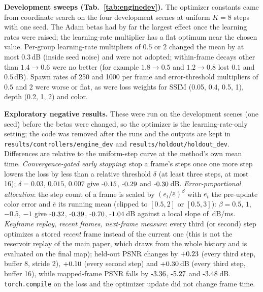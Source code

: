 \documentclass[10pt,twocolumn,letterpaper]{article}
\begin{document}
\textbf{Development sweeps (Tab.~\ref{tab:enginedev}).} The optimizer constants came from coordinate search on the four development scenes at uniform $K{=}8$ steps with one seed. The Adam betas had by far the largest effect once the learning rates were raised; the learning-rate multiplier has a flat optimum near the chosen value. Per-group learning-rate multipliers of $0.5$ or $2$ changed the mean by at most $0.3$\,dB (inside seed noise) and were not adopted; within-frame decays other than $1.4\to0.6$ were no better (for example $1.8\to0.5$ and $1.2\to0.8$ lost $0.1$ and $0.5$\,dB). Spawn rates of 250 and 1000 per frame and error-threshold multipliers of $0.5$ and $2$ were worse or flat, as were loss weights for SSIM (0.05, 0.4, 0.5, 1), depth (0.2, 1, 2) and color.


\textbf{Exploratory negative results.} These were run on the development scenes (one seed) before the betas were changed, so the optimizer is the learning-rate-only setting; the code was removed after the runs and the outputs are kept in \texttt{results/controllers/engine\_dev} and \texttt{results/holdout/holdout\_dev}. Differences are relative to the uniform-step curve at the method's own mean time. \emph{Convergence-gated early stopping}: stop a frame's steps once one more step lowers the loss by less than a relative threshold $\delta$ (at least three steps, at most 16); $\delta{=}0.03$, $0.015$, $0.007$ give $\engNegEarlyZeroZeroThree$, $\engNegEarlyZeroZeroOneFive$ and $\engNegEarlyZeroZeroZeroSeven$\,dB. \emph{Error-proportional allocation}: the step count of a frame is scaled by $(e_t/\bar e)^{\beta}$ with $e_t$ the pre-update color error and $\bar e$ its running mean (clipped to $[0.5,2]$ or $[0.5,3]$): $\beta{=}0.5$, $1$, $-0.5$, $-1$ give $\engNegAllocPos$, $\engNegAllocPosOne$, $\engNegAllocNeg$, $\engNegAllocNegOne$\,dB against a local slope of \engNegSlope\,dB/ms. \emph{Keyframe replay, recent frames, next-frame measure}: every third (or second) step optimizes a stored \emph{recent} frame instead of the current one (this is not the reservoir replay of the main paper, which draws from the whole history and is evaluated on the final map); held-out PSNR changes by $+0.23$ (every third step, buffer 8, stride 2), $+0.10$ (every second step) and $+0.30$\,dB (every third step, buffer 16), while mapped-frame PSNR falls by $\engNegReplayFixkOneZeroReplayThreeMapped$, $\engNegReplayFixkOneZeroRTwoSEightMapped$ and $\engNegReplayFixkOneZeroRThreeSOneSixMapped$\,dB. \texttt{torch.compile} on the loss and the optimizer update did not change frame time.
\end{document}
